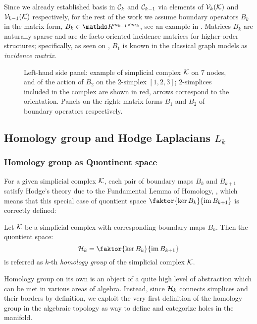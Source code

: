 Since we already established basis in \( \mathcal{C}_k \) and \( \mathcal{C}_{k-1}\) via elements of \( \mathcal{V}_{k}(\mathcal{K}) \) and \( \mathcal{V}_{k-1}(\mathcal{K}) \) respectively, for the rest of the work we assume boundary operators \( B_k \) in the matrix form, \( B_k \in \ds R^{ m_{k-1} \times m_k }\), see an example in . Matrices \( B_k \) are naturally sparse and are de facto oriented incidence matrices for higher-order structures; specifically, as seen on , \( B_1 \) is known in the classical graph models as \emph{incidence matrix}.
\begin{figure}[hbtp]
      \centering
      
      \caption{
            Left-hand side panel: example of simplicial complex $\mathcal{K}$ on $7$ nodes, and of the action of $B_2$ on the 2-simplex $[1,2,3]$; $2$-simplices included in the complex are shown in red, arrows correspond to the orientation. Panels on the right: matrix forms $B_1$ and $B_2$ of boundary operators respectively. \label{fig:bound_mat}
      }
\end{figure}



\subsection{ Homology group and Hodge Laplacians \( L_k \) }

\subsubsection{Homology group as Quontinent space}

For a given simplicial complex \( \mathcal{K} \), each pair of boundary maps \( B_k \) and \( B_{k+1 } \) satisfy Hodge's theory due to the Fundamental Lemma of Homology, , which means that this special case of quontient space \( \faktor{ \ker B_k }{ \im B_{k+1} } \) is correctly defined:

\begin{definition}
      Let \( \mathcal{K} \) be a simplicial complex with corresponding boundary maps \( B_k \). Then the quontient space:
      \begin{equation}
            \mc H_k = \faktor{ \ker B_k }{ \im B_{k+1} } 
      \end{equation}
      is referred as  \(k\)-th \emph{homology group} of the simplicial complex \( \mathcal{K} \).
\end{definition}

Homology group on its own is an object of a quite high level of abstraction which can be met in various areas of algebra. Instead, since \( \mathcal{H}_k \) connects simplices and their borders by definition, we exploit the very first definition of the homology group in the algebraic topology as way to define and categorize holes in the manifold.

